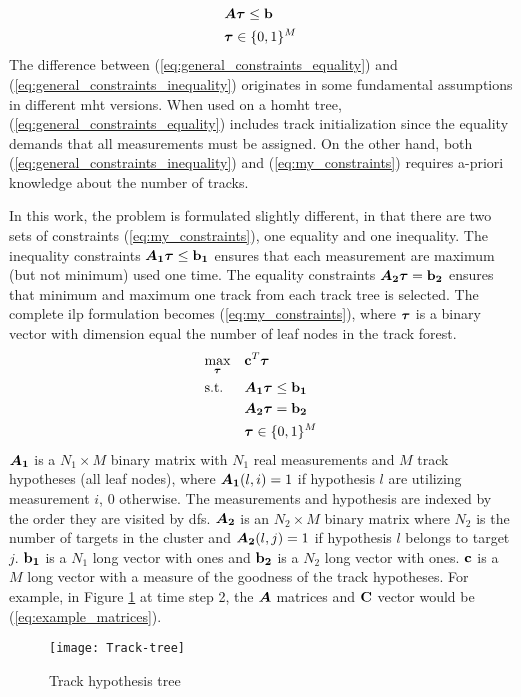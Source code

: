 \begin{equation}
\begin{aligned}
&	\bm{A} \boldsymbol{\mathbf{\tau}} \leq \boldsymbol{\mathbf{b}} 	\\
&	\boldsymbol{\mathbf{\tau}} \in \{0,1\}^M
\end{aligned}
\label{eq:general_constraints_inequality}
\end{equation}
The difference between (\ref{eq:general_constraints_equality}) and (\ref{eq:general_constraints_inequality}) originates in some fundamental assumptions in different \gls{mht} versions. When used on a \gls{homht} tree, (\ref{eq:general_constraints_equality}) includes track initialization since the equality demands that all measurements must be assigned. On the other hand, both (\ref{eq:general_constraints_inequality}) and (\ref{eq:my_constraints}) requires a-priori knowledge about the number of tracks.

In this work, the problem is formulated slightly different, in that there are two sets of constraints (\ref{eq:my_constraints}), one equality and one inequality. The inequality constraints $\bm{A_1} \boldsymbol{\mathbf{\tau}} \leq \boldsymbol{\mathbf{b_1}}$ ensures that each measurement are maximum (but not minimum) used one time. The equality constraints $\bm{A_2} \boldsymbol{\mathbf{\tau}} = \boldsymbol{\mathbf{b_2}}$ ensures that minimum and maximum one track from each track tree is selected. The complete \gls{ilp} formulation becomes (\ref{eq:my_constraints}), where $\boldsymbol{\mathbf{\tau}}$ is a binary vector with dimension equal the number of leaf nodes in the track forest.
\begin{equation}
\begin{aligned}
&	\underset{\boldsymbol{\mathbf{\tau}}}{\text{max}}
&&	\boldsymbol{\mathbf{c}}^T \boldsymbol{\mathbf{\tau}} \\
&	\text{s.t.}
&&	\bm{A_1} \boldsymbol{\mathbf{\tau}} \leq \boldsymbol{\mathbf{b_1}} 	\\
&&&	\bm{A_2} \boldsymbol{\mathbf{\tau}} = \boldsymbol{\mathbf{b_2}}	\\
&&&	\boldsymbol{\mathbf{\tau}} \in \{0,1\}^M
\end{aligned}
\label{eq:my_constraints}
\end{equation}
$\bm{A_1}$ is a $N_1 \times M$ binary matrix with $N_1$ real measurements and $M$ track hypotheses (all leaf nodes), where $\bm{A_1}(l,i)=1$ if hypothesis $l$ are utilizing measurement $i$, $0$ otherwise. The measurements and hypothesis are indexed by the order they are visited by \gls{dfs}. $\bm{A_2}$ is an $N_2 \times M$ binary matrix where $N_2$ is the number of targets in the cluster and $\bm{A_2}(l,j)=1$ if hypothesis $l$ belongs to target $j$. $\boldsymbol{\mathbf{b_1}}$ is a $N_1$ long vector with ones and $\boldsymbol{\mathbf{b_2}}$ is a $N_2$ long vector with ones. $\boldsymbol{\mathbf{c}}$ is a $M$ long vector with a measure of the goodness of the track hypotheses. For example, in Figure \ref{fig:hyp-tree} at time step 2, the $\bm{A}$ matrices and $\boldsymbol{\mathbf{C}}$ vector would be (\ref{eq:example_matrices}).
\begin{figure}[H]
\centering
\texttt{[image: Track-tree]}
\caption{Track hypothesis tree}
\label{fig:hyp-tree}
\end{figure}

